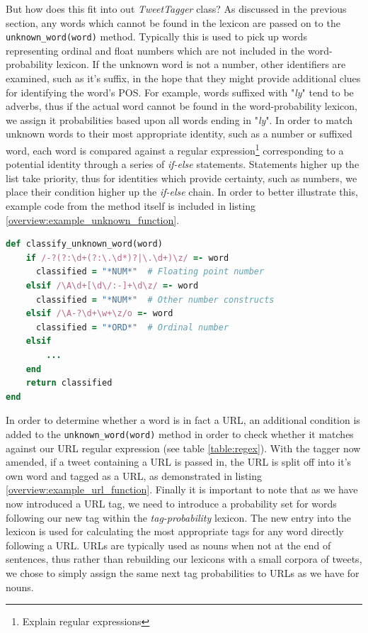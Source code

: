 But how does this fit into out \emph{TweetTagger} class? As discussed in the previous section, any words which cannot be found in the lexicon are passed on to the \texttt{unknown\-\_word\-(word)} method. Typically this is used to pick up words representing ordinal and float numbers which are not included in the word-probability lexicon. If the unknown word is not a number, other identifiers are examined, such as it's suffix, in the hope that they might provide additional clues for identifying the word's POS. For example, words suffixed with "\emph{ly}" tend to be adverbs, thus if the actual word cannot be found in the word-probability lexicon, we assign it probabilities based upon all words ending in "\emph{ly}". In order to match unknown words to their most appropriate identity, such as a number or suffixed word, each word is compared against a regular expression\footnote{Explain regular expressions} corresponding to a potential identity through a series of \emph{if-else} statements. Statements higher up the list take priority, thus for identities which provide certainty, such as numbers, we place their condition higher up the \emph{if-else} chain. In order to better illustrate this, example code from the method itself is included in listing \ref{overview:example_unknown_function}.

\begin{lstlisting}[language=Ruby, caption={Example if-else statements for handling unknown words}, label=overview:example_unknown_function]
def classify_unknown_word(word)
	if /-?(?:\d+(?:\.\d*)?|\.\d+)\z/ =- word 
	  classified = "*NUM*"	# Floating point number
	elsif /\A\d+[\d\/:-]+\d\z/ =- word  
	  classified = "*NUM*"	# Other number constructs
	elsif /\A-?\d+\w+\z/o =- word
	  classified = "*ORD*"	# Ordinal number
	elsif
		...
	end
	return classified
end
\end{lstlisting}

In order to determine whether a word is in fact a URL, an additional condition is added to the \texttt{unknown\_word(word)} method in order to  check whether it matches against our URL regular expression (see table \ref{table:regex}). With the tagger now amended, if a tweet containing a URL is passed in, the URL is split off into it's own word and tagged as a URL, as demonstrated in listing \ref{overview:example_url_function}. Finally it is important to note that as we have now introduced a URL tag, we need to introduce a probability set for words following our new tag within the \emph{tag-probability} lexicon. The new entry into the lexicon is used for calculating the most appropriate tags for any word directly following a URL. URLs are typically used as nouns when not at the end of sentences, thus rather than rebuilding our lexicons with a small corpora of tweets, we chose to simply assign the same next tag probabilities to URLs as we have for nouns.

